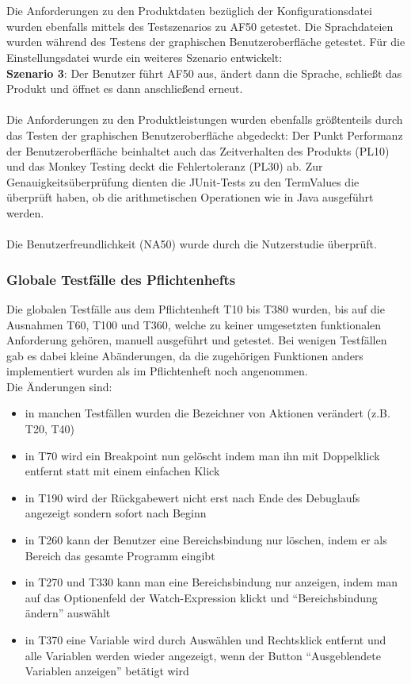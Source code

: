 \documentclass[parskip=full]{scrartcl}
\begin{document}
\\
 \\
Die Anforderungen zu den Produktdaten bezüglich der Konfigurationsdatei wurden ebenfalls mittels des Testszenarios zu AF50 getestet. Die Sprachdateien wurden während des Testens der graphischen Benutzeroberfläche getestet. Für die Einstellungsdatei wurde ein weiteres Szenario entwickelt: \\
\textbf{Szenario 3}: Der Benutzer führt AF50 aus, ändert dann die Sprache, schließt das Produkt und öffnet es dann anschließend erneut. \\
 \\
Die Anforderungen zu den Produktleistungen wurden ebenfalls größtenteils durch das Testen der graphischen Benutzeroberfläche abgedeckt: Der Punkt Performanz der Benutzeroberfläche beinhaltet auch das Zeitverhalten des Produkts (PL10) und das Monkey Testing deckt die Fehlertoleranz (PL30) ab. Zur Genauigkeitsüberprüfung dienten die JUnit-Tests zu den TermValues die überprüft haben, ob die arithmetischen Operationen wie in Java ausgeführt werden. \\
 \\
Die Benutzerfreundlichkeit (NA50) wurde durch die Nutzerstudie überprüft. 

\subsubsection{Globale Testfälle des Pflichtenhefts} %
Die globalen Testfälle aus dem Pflichtenheft T10 bis T380 wurden, bis auf die Ausnahmen T60, T100 und T360, welche zu keiner umgesetzten funktionalen Anforderung gehören, manuell ausgeführt und getestet. Bei wenigen Testfällen gab es dabei kleine Abänderungen, da die zugehörigen Funktionen anders implementiert wurden als im Pflichtenheft noch angenommen. \\
Die Änderungen sind: \\
\begin{itemize}
	\item in manchen Testfällen wurden die Bezeichner von Aktionen verändert (z.B. T20, T40)
	\item in T70 wird ein Breakpoint nun gelöscht indem man ihn mit Doppelklick entfernt statt mit einem einfachen Klick
	\item  in T190 wird der Rückgabewert nicht erst nach Ende des Debuglaufs angezeigt sondern sofort nach Beginn
	\item in T260 kann der Benutzer eine Bereichsbindung nur löschen, indem er als Bereich das gesamte Programm eingibt
	\item in T270 und T330 kann man eine Bereichsbindung nur anzeigen, indem man auf das Optionenfeld der Watch-Expression klickt und \enquote{Bereichsbindung ändern} auswählt
	\item in T370 eine Variable wird durch Auswählen und Rechtsklick entfernt und alle Variablen werden wieder angezeigt, wenn der Button \enquote{Ausgeblendete Variablen anzeigen} betätigt wird
\end{itemize}
\end{document}
